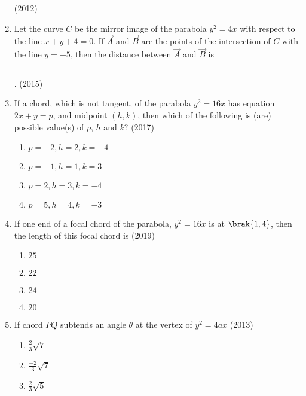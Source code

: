 \begin{enumerate}
\hfill(2012)
\item Let the curve $C$ be the mirror image of the parabola $y^2=4x$ with respect to the line $x+y+4=0$. If $\Vec{A}$ and $\Vec{B}$ are the points of the intersection of $C$ with the line $y=-5$, then the distance between $\Vec{A}$ and $\Vec{B}$ is \rule{1cm}{0.1pt}.
\hfill(2015)
      \item If a chord, which is not tangent, of the parabola $y^2=16x$ has equation $2x+y=p$, and midpoint $(h,k)$, then which of the following is (are) possible value(s) of $p$, $h$ and $k$? 
	      \hfill(2017)
\begin{multicols}{2}
	       \begin{enumerate}
		      \item $p=-2,h=2,k=-4$
		      \item $p=-1,h=1,k=3$
		      \item $p=2,h=3,k=-4$
		      \item $p=5,h=4,k=-3$
	       \end{enumerate}
\end{multicols}
\item If one end of a focal chord of the parabola, $y^2=16x$ is at $\brak{1,4}$, then the length of this focal chord is 
     \hfill{(2019)}
\begin{multicols}{4}
	\begin{enumerate}
    		\item $25$
    		\item $22$
    		\item $24$
    		\item $20$
	\end{enumerate}
\end{multicols}    

\item If chord $PQ$ subtends an angle $\theta$  at the vertex of $y^2=4ax$
\hfill(2013)

\begin{multicols}{4}
\begin{enumerate}
    \item $\frac{2}{3}\sqrt{7}$
    
    \item $\frac{-2}{3}\sqrt{7}$
    
    \item $\frac{2}{3}\sqrt{5}$
    

\end{enumerate}
\end{multicols}
\end{enumerate}
